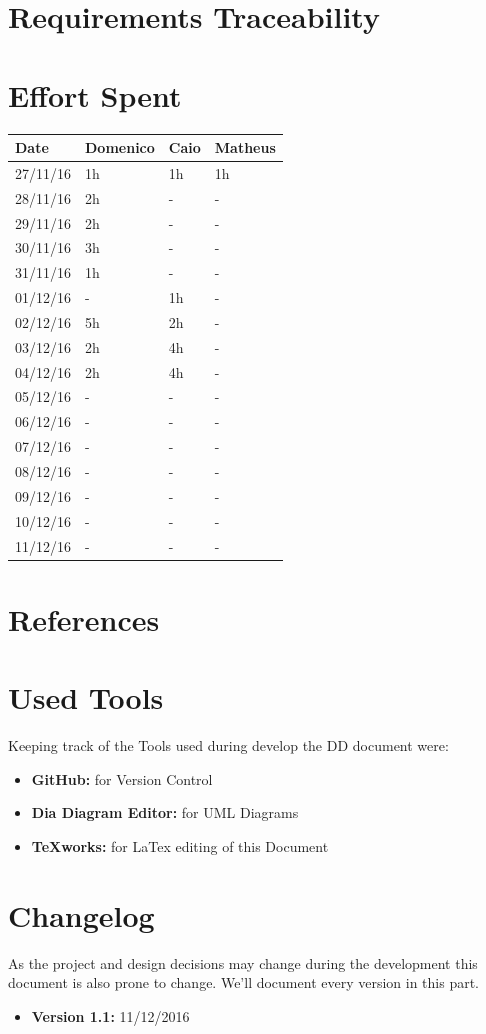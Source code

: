 \documentclass[a4paper]{article}
\begin{document}
\newpage
\section{Requirements Traceability}

\newpage
\section{Effort Spent}
\begin{tabular}{ | l | l | l | l | }
\hline
	\textbf {Date} & \textbf {Domenico} & \textbf {Caio} & \textbf {Matheus} \\ \hline
	27/11/16& 1h & 1h & 1h  \\ \hline
	28/11/16& 2h & - & - \\ \hline
	29/11/16& 2h & - & - \\ \hline
	30/11/16& 3h & - & - \\ \hline
	31/11/16& 1h & - & - \\ \hline
	01/12/16& - & 1h & - \\ \hline
	02/12/16& 5h & 2h & - \\ \hline
	03/12/16& 2h & 4h & - \\ \hline
	04/12/16& 2h & 4h & - \\ \hline
	05/12/16& - & - & - \\ \hline
	06/12/16& - & - & - \\ \hline
	07/12/16& - & - & - \\ \hline
	08/12/16& - & - & - \\ \hline
	09/12/16& - & - & - \\ \hline
	10/12/16& - & - & - \\ \hline
	11/12/16& - & - & - \\ \hline
\end{tabular}
\newpage

\section{References}
\newpage


\section{Used Tools}
Keeping track of the Tools used during develop the DD document were:
\begin{itemize}
	\item \textbf{GitHub:} for Version Control
	\item \textbf {Dia Diagram Editor:} for UML Diagrams
	\item \textbf {TeXworks:} for LaTex editing of this Document
\end{itemize}
\newpage

\section{Changelog}
As the project and design decisions may change during the development this document is also prone to change.
We'll document every version in this part.
\begin{itemize}
\item \textbf {Version 1.1:} 11/12/2016
\end{itemize}
\end{document}
